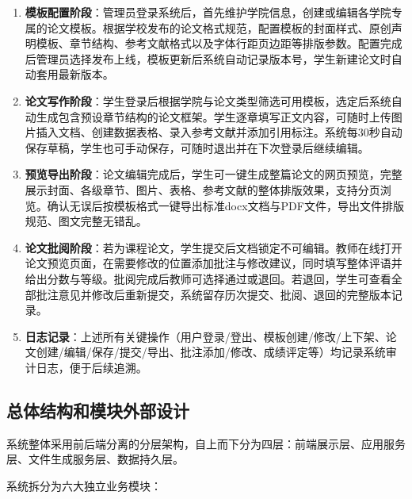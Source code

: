 \documentclass{../template/softeng}
\begin{document}
\begin{enumerate}
	\item \textbf{模板配置阶段}：管理员登录系统后，首先维护学院信息，创建或编辑各学院专属的论文模板。根据学校发布的论文格式规范，配置模板的封面样式、原创声明模板、章节结构、参考文献格式以及字体行距页边距等排版参数。配置完成后管理员选择发布上线，模板更新后系统自动记录版本号，学生新建论文时自动套用最新版本。
	
	\item \textbf{论文写作阶段}：学生登录后根据学院与论文类型筛选可用模板，选定后系统自动生成包含预设章节结构的论文框架。学生逐章填写正文内容，可随时上传图片插入文档、创建数据表格、录入参考文献并添加引用标注。系统每30秒自动保存草稿，学生也可手动保存，可随时退出并在下次登录后继续编辑。
	
	\item \textbf{预览导出阶段}：论文编辑完成后，学生可一键生成整篇论文的网页预览，完整展示封面、各级章节、图片、表格、参考文献的整体排版效果，支持分页浏览。确认无误后按模板格式一键导出标准docx文档与PDF文件，导出文件排版规范、图文完整无错乱。
	
	\item \textbf{论文批阅阶段}：若为课程论文，学生提交后文档锁定不可编辑。教师在线打开论文预览页面，在需要修改的位置添加批注与修改建议，同时填写整体评语并给出分数与等级。批阅完成后教师可选择通过或退回。若退回，学生可查看全部批注意见并修改后重新提交，系统留存历次提交、批阅、退回的完整版本记录。
	
	\item \textbf{日志记录}：上述所有关键操作（用户登录/登出、模板创建/修改/上下架、论文创建/编辑/保存/提交/导出、批注添加/修改、成绩评定等）均记录系统审计日志，便于后续追溯。
\end{enumerate}

\subsection{总体结构和模块外部设计}

系统整体采用前后端分离的分层架构，自上而下分为四层：前端展示层、应用服务层、文件生成服务层、数据持久层。

系统拆分为六大独立业务模块：
\end{document}
